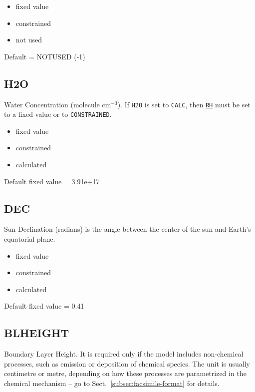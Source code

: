 \begin{itemize}
\item fixed value
\item constrained
\item not used
\end{itemize}

Default = NOTUSED (-1)

\subsection{H2O} \label{subsec:h2o}

Water Concentration (molecule cm$^{-3}$). If \texttt{H2O} is set to
\texttt{CALC}, then \hyperref[subsec:rh]{\texttt{RH}} must be set to a
fixed value or to \texttt{CONSTRAINED}.

\begin{itemize}
\item fixed value
\item constrained
\item calculated
\end{itemize}

Default fixed value = 3.91e+17

\subsection{DEC} \label{subsec:dec}

Sun Declination (radians) is the angle between the center of the sun
and Earth's equatorial plane.

\begin{itemize}
\item fixed value
\item constrained
\item calculated
\end{itemize}

Default fixed value = 0.41

\subsection{BLHEIGHT} \label{subsec:blheight}

Boundary Layer Height. It is required only if the model includes
non-chemical processes, such as emission or deposition of chemical
species. The unit is usually centimetre or metre, depending on how
these processes are parametrized in the chemical mechanism -- go to
Sect.~\ref{subsec:facsimile-format} for details.

